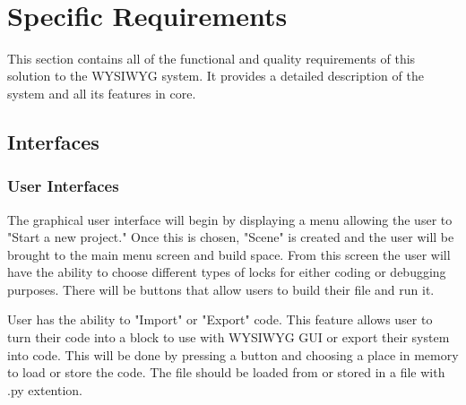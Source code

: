 \documentclass[journal,10pt,onecolumn,compsoc]{IEEEtran} \usepackage[margin=1.0in]{geometry} \usepackage{pdfpages} \usepackage{graphicx}
\begin{document}
\begin{minipage}{\textwidth}
		\\
	\end{minipage}


\newpage

\section{Specific Requirements}

This section contains all of the functional and quality requirements of this solution to the WYSIWYG system. 
It provides a detailed description of the system and all its features in core.


\subsection{Interfaces}
\subsubsection{User Interfaces}

The graphical user interface will begin by displaying a menu allowing the user to "Start a new project."
Once this is chosen, "Scene" is created and the user will be brought to the main menu screen and build space.
From this screen the user will have the ability to choose different types of locks for either coding or debugging purposes.
There will be buttons that allow users to build their file and run it.

User has the ability to "Import" or "Export" code.
This feature allows user to turn their code into a block to use with WYSIWYG GUI or export their system into code.
This will be done by pressing a button and choosing a place in memory to load or store the code. 
The file should be loaded from or stored in a file with .py extention.
\end{document}
